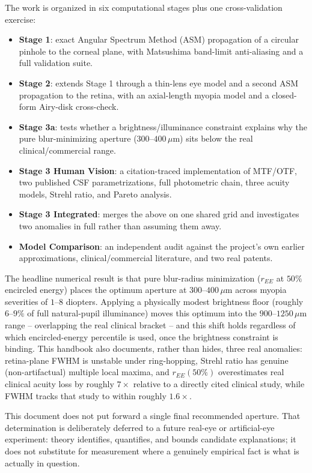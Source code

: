 \documentclass[11pt]{report}
\begin{document}
The work is organized in six computational stages plus one cross-validation exercise:
\begin{itemize}[leftmargin=1.2cm]
\item \textbf{Stage 1}: exact Angular Spectrum Method (ASM) propagation of a circular pinhole to the corneal plane, with Matsushima band-limit anti-aliasing and a full validation suite.
\item \textbf{Stage 2}: extends Stage 1 through a thin-lens eye model and a second ASM propagation to the retina, with an axial-length myopia model and a closed-form Airy-disk cross-check.
\item \textbf{Stage 3a}: tests whether a brightness/illuminance constraint explains why the pure blur-minimizing aperture ($300$--$400\,\mu$m) sits below the real clinical/commercial range.
\item \textbf{Stage 3 Human Vision}: a citation-traced implementation of MTF/OTF, two published CSF parametrizations, full photometric chain, three acuity models, Strehl ratio, and Pareto analysis.
\item \textbf{Stage 3 Integrated}: merges the above on one shared grid and investigates two anomalies in full rather than assuming them away.
\item \textbf{Model Comparison}: an independent audit against the project's own earlier approximations, clinical/commercial literature, and two real patents.
\end{itemize}

The headline numerical result is that pure blur-radius minimization ($r_{EE}$ at $50\%$ encircled energy) places the optimum aperture at $300$--$400\,\mu$m across myopia severities of $1$--$8$ diopters. Applying a physically modest brightness floor (roughly $6$--$9\%$ of full natural-pupil illuminance) moves this optimum into the $900$--$1250\,\mu$m range -- overlapping the real clinical bracket -- and this shift holds regardless of which encircled-energy percentile is used, once the brightness constraint is binding. This handbook also documents, rather than hides, three real anomalies: retina-plane FWHM is unstable under ring-hopping, Strehl ratio has genuine (non-artifactual) multiple local maxima, and $r_{EE}(50\%)$ overestimates real clinical acuity loss by roughly $7\times$ relative to a directly cited clinical study, while FWHM tracks that study to within roughly $1.6\times$.

This document does not put forward a single final recommended aperture. That determination is deliberately deferred to a future real-eye or artificial-eye experiment: theory identifies, quantifies, and bounds candidate explanations; it does not substitute for measurement where a genuinely empirical fact is what is actually in question.
\end{document}
